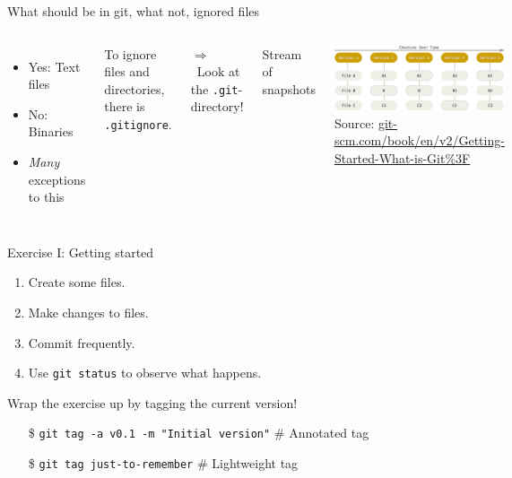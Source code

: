 \documentclass[aspectratio=169]{beamer}
\newcommand{\dra}{\ensuremath{\Rightarrow }~}
\newcommand{\code}[1]{\texttt{\color{mygreen}#1}}
\begin{document}
\begin{frame}
  {What should be in git, what not, ignored files}

  \begin{columns}

  \begin{itemize}
    \item Yes: Text files
    \item No: Binaries
    \item \emph{Many} exceptions to this
  \end{itemize}

  \vspace{.5cm}

  To ignore files and directories,\\
  there is \code{.gitignore}.

  \vspace{.5cm}

  \dra Look at the \code{.git}-directory!


  \alert{Stream of snapshots}

    \includegraphics[width=\textwidth]{snapshots}
  {\tiny Source:
    \href{https://git-scm.com/book/en/v2/Getting-Started-What-is-Git\%3F}%
    {git-scm.com/book/en/v2/Getting-Started-What-is-Git\%3F}}
  \end{columns}

\end{frame}

\begin{frame}
  {Exercise I: Getting started}

  \begin{enumerate}\itemsep0.3cm
    \item Create some files.
    \item Make changes to files.
    \item Commit frequently.
    \item Use \code{git status} to observe what happens.
  \end{enumerate}

  \vspace{.5cm}

  Wrap the exercise up by tagging the current version!
  \begin{itemize}
    \item[\$] \code{git tag -a v0.1 -m "Initial version"} \# Annotated tag
    \item[\$] \code{git tag just-to-remember} \# Lightweight tag
  \end{itemize}

\end{frame}
\end{document}
